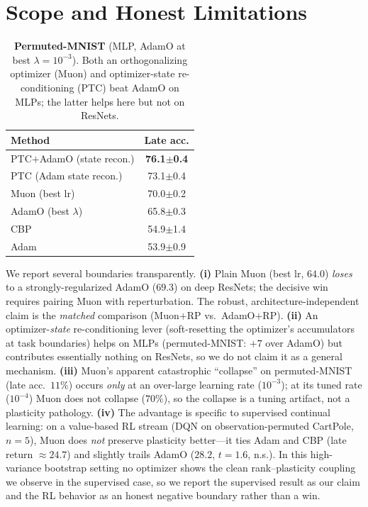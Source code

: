 \documentclass[letterpaper]{article} %
\begin{document}
\section{Scope and Honest Limitations}\label{sec:scope}
\begin{table}[t]\centering\small
\caption{\textbf{Permuted-MNIST} (MLP, AdamO at best $\lambda{=}10^{-3}$). Both an orthogonalizing optimizer (Muon) and optimizer-state re-conditioning (PTC) beat AdamO on MLPs; the latter helps here but not on ResNets.}
\label{tab:pmnist}
\begin{tabular}{lc}
\toprule
Method & Late acc. \\
\midrule
PTC$+$AdamO (state recon.) & \textbf{76.1$\pm$0.4} \\
PTC (Adam state recon.) & 73.1$\pm$0.4 \\
Muon (best lr) & 70.0$\pm$0.2 \\
AdamO (best $\lambda$) & 65.8$\pm$0.3 \\
CBP & 54.9$\pm$1.4 \\
Adam & 53.9$\pm$0.9 \\
\bottomrule
\end{tabular}
\end{table}
We report several boundaries transparently. \textbf{(i)} Plain Muon (best lr, $64.0$) \emph{loses} to a strongly-regularized AdamO ($69.3$) on deep ResNets; the decisive win requires pairing Muon with reperturbation. The robust, architecture-independent claim is the \emph{matched} comparison (Muon$+$RP vs.\ AdamO$+$RP). \textbf{(ii)} An optimizer-\emph{state} re-conditioning lever (soft-resetting the optimizer's accumulators at task boundaries) helps on MLPs (permuted-MNIST: $+7$ over AdamO) but contributes essentially nothing on ResNets, so we do not claim it as a general mechanism. \textbf{(iii)} Muon's apparent catastrophic ``collapse'' on permuted-MNIST (late acc.\ $11\%$) occurs \emph{only} at an over-large learning rate ($10^{-3}$); at its tuned rate ($10^{-4}$) Muon does not collapse ($70\%$), so the collapse is a tuning artifact, not a plasticity pathology. \textbf{(iv)} The advantage is specific to supervised continual learning: on a value-based RL stream (DQN on observation-permuted CartPole, $n{=}5$), Muon does \emph{not} preserve plasticity better---it ties Adam and CBP (late return ${\approx}24.7$) and slightly trails AdamO ($28.2$, $t{=}1.6$, n.s.). In this high-variance bootstrap setting no optimizer shows the clean rank--plasticity coupling we observe in the supervised case, so we report the supervised result as our claim and the RL behavior as an honest negative boundary rather than a win.
\end{document}
